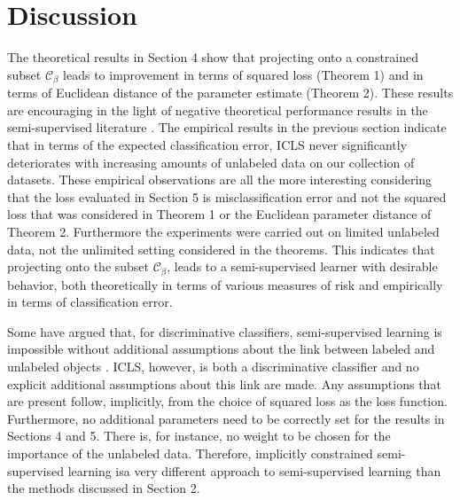 \documentclass[smallcondensed]{svjour3}
\newcommand{\Cb}{\mathcal{C}_{\beta}}
\begin{document}




\section{Discussion}
The theoretical results in Section 4 show that projecting onto a constrained subset $\Cb$ leads to improvement in terms of squared loss (Theorem 1) and in terms of Euclidean distance of the parameter estimate (Theorem 2). These results are encouraging in the light of negative theoretical performance results in the semi-supervised literature \cite{Cozman2006}. The empirical results in the previous section indicate that in terms of the expected classification error, ICLS never significantly deteriorates with increasing amounts of unlabeled data on our collection of datasets. These empirical observations are all the more interesting considering that the loss evaluated in Section 5 is misclassification error and not the squared loss that was considered in Theorem 1 or the Euclidean parameter distance of Theorem 2. Furthermore the experiments were carried out on limited unlabeled data, not the unlimited setting considered in the theorems. This indicates that projecting onto the subset $\Cb$, leads to a semi-supervised learner with desirable behavior, both theoretically in terms of various measures of risk and empirically in terms of classification error.

Some have argued that, for discriminative classifiers, semi-supervised learning is impossible without additional assumptions about the link between labeled and unlabeled objects \cite{Seeger2001}. ICLS, however, is both a discriminative classifier and no explicit additional assumptions about this link are made. Any assumptions that are present follow, implicitly, from the choice of squared loss as the loss function. Furthermore, no additional parameters need to be correctly set for the results in Sections 4 and 5. There is, for instance, no weight to be chosen for the importance of the unlabeled data. Therefore, implicitly constrained semi-supervised learning  isa very different approach to semi-supervised learning than the methods discussed in Section 2.
\end{document}
